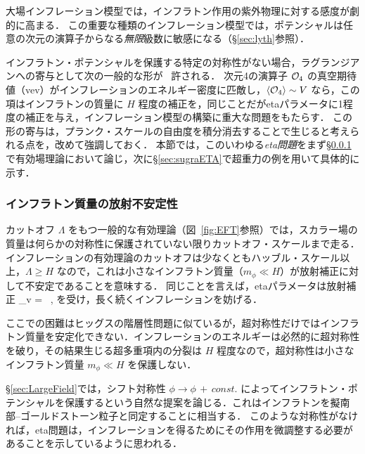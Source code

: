 大場インフレーション模型では，インフラトン作用の紫外物理に対する感度が劇的に高まる．
この重要な種類のインフレーション模型では，ポテンシャルは任意の次元の演算子からなる{\it 無限}級数に敏感になる（\S\ref{sec:lyth}参照）．



インフラトン・ポテンシャルを保護する特定の対称性がない場合，ラグランジアンへの寄与として次の一般的な形が
\beq
{}\,
\eeq
許される．
次元4の演算子 ${\cal O}_4$ の真空期待値（vev）がインフレーションのエネルギー密度に匹敵し，$\langle{\cal O}_4 \rangle \sim V$ なら，この項はインフラトンの質量に $H$ 程度の補正を，同じことだがetaパラメータに1程度の補正を与え，インフレーション模型の構築に重大な問題をもたらす．
この形の寄与は，プランク・スケールの自由度を積分消去することで生じると考えられる点を，改めて強調しておく．
本節では，このいわゆる{\it eta問題}をまず\S\ref{sec:higgs}で有効場理論において論じ，次に\S\ref{sec:sugraETA}で超重力の例を用いて具体的に示す．

\subsubsection{インフラトン質量の放射不安定性}
\label{sec:higgs}

カットオフ $\Lambda$ をもつ一般的な有効理論（図~\ref{fig:EFT}参照）では，スカラー場の質量は何らかの対称性に保護されていない限りカットオフ・スケールまで走る．
インフレーションの有効理論のカットオフは少なくともハッブル・スケール以上，$\Lambda \ge H$ なので，これは小さなインフラトン質量（$m_\phi \ll H$）が放射補正に対して不安定であることを意味する．
同じことを言えば，etaパラメータは放射補正
\beq
\Delta\eta_{\rm v} =  \, ,
\eeq
を受け，長く続くインフレーションを妨げる．

ここでの困難はヒッグスの階層性問題に似ているが，超対称性だけではインフラトン質量を安定化できない．インフレーションのエネルギーは必然的に超対称性を破り，その結果生じる超多重項内の分裂は $H$ 程度なので，超対称性は小さなインフラトン質量 $m_\phi \ll H$ を保護しない．

\S\ref{sec:LargeField}では，シフト対称性 $\phi\to\phi \, +\, const.$ によってインフラトン・ポテンシャルを保護するという自然な提案を論じる．これはインフラトンを擬南部--ゴールドストーン粒子と同定することに相当する．
このような対称性がなければ，eta問題は，インフレーションを得るためにその作用を微調整する必要があることを示しているように思われる．



